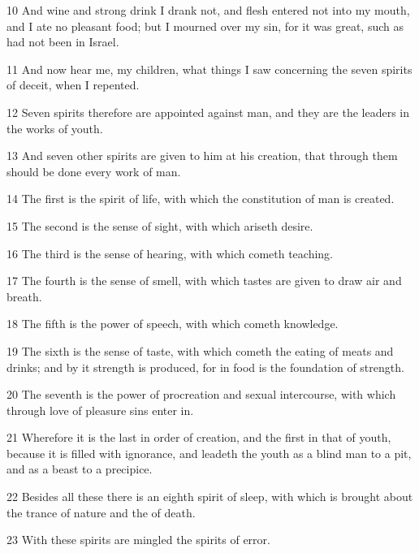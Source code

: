 \par 10 And wine and strong drink I drank not, and flesh entered not into my mouth, and I ate no pleasant food; but I mourned over my sin, for it was great, such as had not been in Israel.

\par 11 And now hear me, my children, what things I saw concerning the seven spirits of deceit, when I repented.

\par 12 Seven spirits therefore are appointed against man, and they are the leaders in the works of youth.

\par 13 And seven other spirits are given to him at his creation, that through them should be done every work of man.

\par 14 The first is the spirit of life, with which the constitution of man is created.

\par 15 The second is the sense of sight, with which ariseth desire.

\par 16 The third is the sense of hearing, with which cometh teaching.

\par 17 The fourth is the sense of smell, with which tastes are given to draw air and breath.

\par 18 The fifth is the power of speech, with which cometh knowledge.

\par 19 The sixth is the sense of taste, with which cometh the eating of meats and drinks; and by it strength is produced, for in food is the foundation of strength.

\par 20 The seventh is the power of procreation and sexual intercourse, with which through love of pleasure sins enter in.

\par 21 Wherefore it is the last in order of creation, and the first in that of youth, because it is filled with ignorance, and leadeth the youth as a blind man to a pit, and as a beast to a precipice.

\par 22 Besides all these there is an eighth spirit of sleep, with which is brought about the trance of nature and the of death.

\par 23 With these spirits are mingled the spirits of error.

